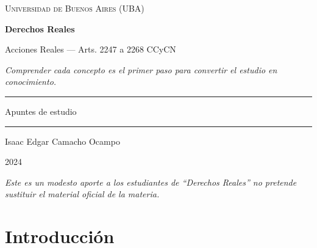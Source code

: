 \documentclass[12pt,oneside]{book}
\newcommand{\universidad}{Universidad de Buenos Aires (UBA)}
\newcommand{\materia}{Derechos Reales}
\newcommand{\titulo}{Acciones Reales --- Arts. 2247 a 2268 CCyCN}
\newcommand{\autor}{Isaac Edgar Camacho Ocampo}
\newcommand{\anio}{2024}
\begin{document}
\begin{titlepage}

\thispagestyle{empty}

\begin{center}

\vspace*{1cm}

{\large \textsc{\universidad}}

\vspace{3cm}

{\Huge \textbf{\materia}}

\vspace{1cm}

{\LARGE \titulo}

\vspace{0.8cm}

\textit{Comprender cada concepto es el primer paso para convertir el estudio en conocimiento.}

\vspace{1.2cm}

\rule{0.70\textwidth}{0.5pt}

\vspace{0.5cm}

{\large Apuntes de estudio}

\vspace{0.5cm}

\rule{0.70\textwidth}{0.5pt}

\vfill

{\large \autor}

\vspace{0.3cm}

{\large \anio}

\end{center}

\vfill

\begin{flushleft}
\textit{Este es un modesto aporte a los estudiantes de ``Derechos Reales'' no pretende sustituir el material oficial de la materia.}
\end{flushleft}

\end{titlepage}

\tableofcontents

\chapter*{Introducción}
\end{document}
